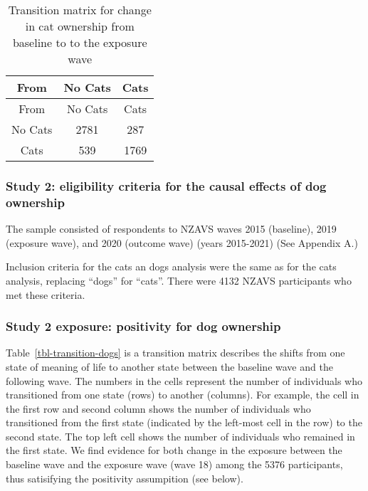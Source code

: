 \documentclass[
  singlecolumn,
  9pt]{article}
\begin{document}
\hypertarget{tbl-transition}{}
\begin{longtable}[]{@{}ccc@{}}
\caption{\label{tbl-transition}Transition matrix for change in cat
ownership from baseline to to the exposure wave}\tabularnewline
\toprule\noalign{}
From & No Cats & Cats \\
\midrule\noalign{}
\endfirsthead
\toprule\noalign{}
From & No Cats & Cats \\
\midrule\noalign{}
\endhead
\bottomrule\noalign{}
\endlastfoot
No Cats & 2781 & 287 \\
Cats & 539 & 1769 \\
\end{longtable}

\subsubsection{Study 2: eligibility criteria for the causal effects of
dog
ownership}\label{study-2-eligibility-criteria-for-the-causal-effects-of-dog-ownership}

The sample consisted of respondents to NZAVS waves 2015 (baseline), 2019
(exposure wave), and 2020 (outcome wave) (years 2015-2021) (See Appendix
A.)

Inclusion criteria for the cats an dogs analysis were the same as for
the cats analysis, replacing ``dogs'' for ``cats''. There were 4132
NZAVS participants who met these criteria.

\subsubsection{Study 2 exposure: positivity for dog
ownership}\label{study-2-exposure-positivity-for-dog-ownership}

Table~\ref{tbl-transition-dogs} is a transition matrix describes the
shifts from one state of meaning of life to another state between the
baseline wave and the following wave. The numbers in the cells represent
the number of individuals who transitioned from one state (rows) to
another (columns). For example, the cell in the first row and second
column shows the number of individuals who transitioned from the first
state (indicated by the left-most cell in the row) to the second state.
The top left cell shows the number of individuals who remained in the
first state. We find evidence for both change in the exposure between
the baseline wave and the exposure wave (wave 18) among the 5376
participants, thus satisifying the positivity assumpition (see below).
\end{document}
